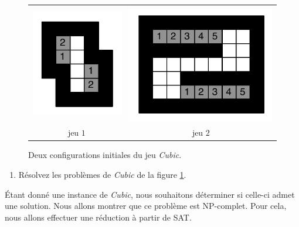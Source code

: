 \documentclass[12pt]{article}
\begin{document}
\begin{figure}[p]
\begin{center}
  \begin{tabular}{c c}
    \includegraphics[scale=0.65]{./figures/exemple1} &
    \includegraphics[scale=0.65]{./figures/exemple2}\\
 jeu $1$ &
 jeu $2$
 \end{tabular}
\end{center}
 \caption{Deux configurations initiales du jeu \textit{Cubic}.}
 \label{exemples}
\end{figure}

\begin{enumerate}
	\item Résolvez les problèmes de \textit{Cubic} de la figure \ref{exemples}.
\end{enumerate}

Étant donné une instance de \textit{Cubic}, nous souhaitons déterminer si celle-ci admet une solution. Nous allons montrer que ce problème est NP-complet. Pour cela, nous allons effectuer une réduction à partir de SAT.
\end{document}
